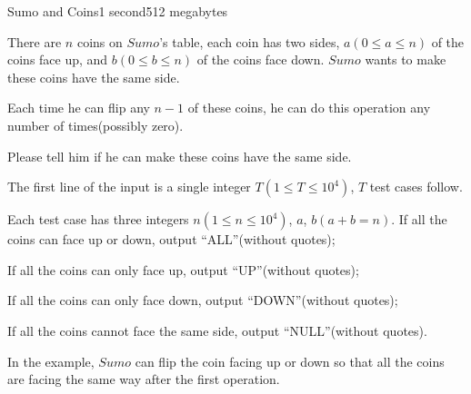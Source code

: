 \documentclass[11pt,a4paper,oneside]{article}
\begin{document}
\begin{problem}{Sumo and Coins}{}{}{1 second}{512 megabytes}
	
	There are $n$ coins on $Sumo$'s table, each coin has two sides, $a(0\leq a\leq n)$ of the coins face up, and $b(0\leq b\leq n)$ of the coins face down. $Sumo$ wants to make these coins have the same side.
	
	Each time he can flip any $n-1$ of these coins, he can do this operation any number of times(possibly zero).
	
	Please tell him if he can make these coins have the same side.
	
	\InputFile
	The first line of the input is a single integer  $T(1 \leq T \leq 10^4)$, $T$ test cases follow.
	
	Each test case has three integers $n(1\leq n\leq 10^4)$, $a$, $b$$(a+b=n)$.
	\OutputFile
	If all the coins can face up or down, output ``ALL''(without quotes);
	
	If all the coins can only face up, output ``UP''(without quotes);
	
	If all the coins can only face down, output ``DOWN''(without quotes);
	
	If all the coins cannot face the same side, output ``NULL''(without quotes).
	
	\Examples
	\begin{example}
	\end{example}
	\Explanation
	In the example, $Sumo$ can flip the coin facing up or down so that all the coins are facing the same way after the first operation.
	
\end{problem}
\end{document}
